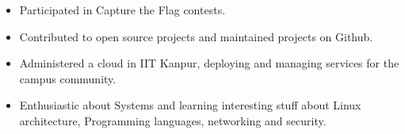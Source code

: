 



{\fontsize{11pt}{1em}\bodyfontlight\upshape\color{text}
\begin{itemize}
  \itemsep-0.3em
    \item Participated in Capture the Flag contests.
    \item Contributed to open source projects and maintained projects on Github.
    \item Administered a cloud in IIT Kanpur, deploying and managing services for the campus community.
    \item Enthusiastic about Systems and learning interesting stuff about Linux architecture, Programming languages, networking and security.
\end{itemize}
}
